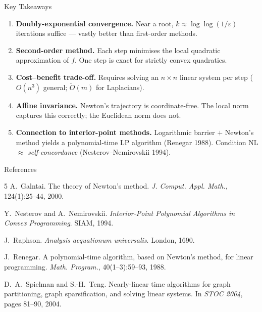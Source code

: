 \documentclass[aspectratio=169,10pt]{beamer}
\begin{document}
\begin{frame}{Key Takeaways}
  \begin{enumerate}\setlength\itemsep{0.55em}
    \item \textbf{Doubly-exponential convergence.}
          Near a root, $k\approx\log\log(1/\varepsilon)$ iterations suffice ---
          vastly better than first-order methods.

    \item \textbf{Second-order method.}
          Each step minimises the local quadratic approximation of $f$.
          One step is exact for strictly convex quadratics.

    \item \textbf{Cost--benefit trade-off.}
          Requires solving an $n{\times}n$ linear system per step
          ($O(n^3)$ general; $\tilde{O}(m)$ for Laplacians).

    \item \textbf{Affine invariance.}
          Newton's trajectory is coordinate-free.
          The local norm captures this correctly; the Euclidean norm does not.

    \item \textbf{Connection to interior-point methods.}
          Logarithmic barrier $+$ Newton's method yields a
          polynomial-time LP algorithm (Renegar 1988).
          Condition NL $\approx$ \emph{self-concordance}
          (Nesterov--Nemirovskii 1994).
  \end{enumerate}
\end{frame}

\begin{frame}[allowframebreaks]{References}
  \begin{thebibliography}{5}
      A.~Galntai.
      \newblock The theory of Newton's method.
      \newblock \emph{J. Comput. Appl. Math.}, 124(1):25--44, 2000.

      Y.~Nesterov and A.~Nemirovskii.
      \newblock \emph{Interior-Point Polynomial Algorithms in Convex Programming}.
      \newblock SIAM, 1994.

      J.~Raphson.
      \newblock \emph{Analysis aequationum universalis}.
      \newblock London, 1690.

      J.~Renegar.
      \newblock A polynomial-time algorithm, based on Newton's method,
                for linear programming.
      \newblock \emph{Math. Program.}, 40(1--3):59--93, 1988.

      D.~A.~Spielman and S.-H.~Teng.
      \newblock Nearly-linear time algorithms for graph partitioning,
                graph sparsification, and solving linear systems.
      \newblock In \emph{STOC 2004}, pages 81--90, 2004.
  \end{thebibliography}
\end{frame}
\end{document}
